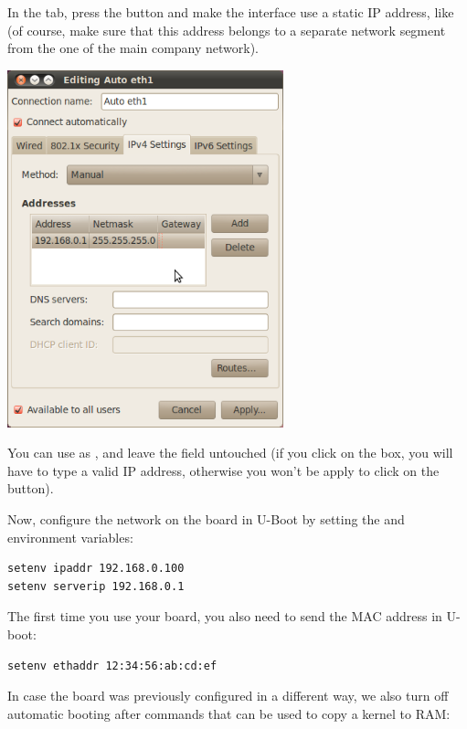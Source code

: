 In the  tab, press the  button
and make the interface use a static IP
address, like  (of course, make sure that this
address belongs to a separate network segment from the one of the main
company network).

\begin{center}
\includegraphics[width=8cm]{../labs/yocto-advanced-configuration/network-config-3.png}
\end{center}

You can use  as , and leave the
 field untouched (if you click on the  box, you
will have to type a valid IP address, otherwise you won't be apply to
click on the  button).

Now, configure the network on the board in U-Boot by setting the 
and  environment variables:

\begin{verbatim}
setenv ipaddr 192.168.0.100
setenv serverip 192.168.0.1
\end{verbatim}

The first time you use your board, you also need to send the MAC address
in U-boot:

\begin{verbatim}
setenv ethaddr 12:34:56:ab:cd:ef
\end{verbatim}

In case the board was previously configured in a different way, we
also turn off automatic booting after commands that can be used to
copy a kernel to RAM:

